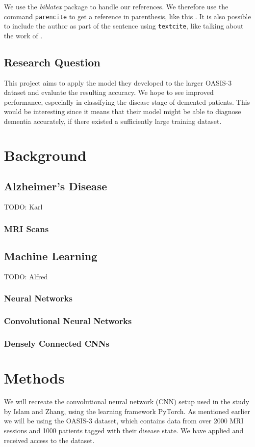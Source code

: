 \documentclass{kththesis}
\begin{document}
We use the \emph{biblatex} package to handle our references.  We therefore use the
command \texttt{parencite} to get a reference in parenthesis, like this
\parencite{heisenberg2015}.  It is also possible to include the author
as part of the sentence using \texttt{textcite}, like talking about
the work of \textcite{einstein2016}.

\section{Research Question}
This project aims to apply the model they developed to the larger OASIS-3 dataset \parencite{lamontagne2018oasis} and evaluate the resulting accuracy. We hope to see improved performance, especially in classifying the disease stage of demented patients. This would be interesting since it means that their model might be able to diagnose dementia accurately, if there existed a sufficiently large training dataset.

\chapter{Background}

\section{Alzheimer's Disease}
TODO: Karl
\subsection{MRI Scans}

\section{Machine Learning}
TODO: Alfred
\subsection{Neural Networks}

\subsection{Convolutional Neural Networks}
\subsection{Densely Connected CNNs}


\chapter{Methods}
We will recreate the convolutional neural network (CNN) setup used in the study by Islam and Zhang, using the learning framework PyTorch. As mentioned earlier we will be using the OASIS-3 dataset, which contains data from over 2000 MRI sessions and 1000 patients tagged with their disease state. We have applied and received access to the dataset. 
\end{document}
